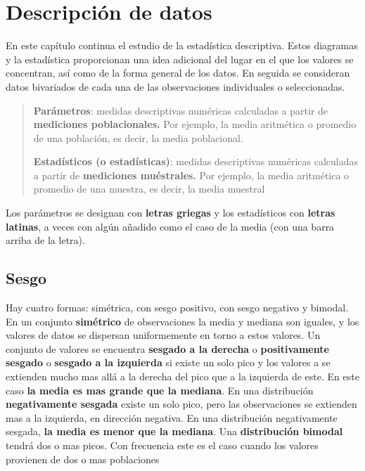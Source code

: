 \documentclass[]{article}
\begin{document}
\section{Descripción de datos}
En este capítulo continua el estudio de la estadística descriptiva. Estos diagramas y la estadística proporcionan una idea adicional del lugar en el que los valores se concentran, así como de la forma general de los datos. En seguida se consideran datos bivariados de cada una de las observaciones individuales o seleccionadas.
\begin{quote}
	\textbf{Parámetros}: medidas descriptivas numéricas calculadas a partir de \textbf{mediciones poblacionales.} Por ejemplo, la media aritmética o promedio de una población, es decir, la media poblacional.
	\item \textbf{Estadísticos (o estadísticas)}: medidas descriptivas numéricas calculadas a partir de \textbf{mediciones muéstrales.} Por ejemplo, la media aritmética o promedio de una muestra, es decir, la media muestral
\end{quote}
Los parámetros se designan con \textbf{letras griegas} y los estadísticos con \textbf{letras latinas}, a veces con algún añadido como el caso de la media (con una barra arriba de la letra).
\subsection{Sesgo}
Hay cuatro formas: simétrica, con sesgo positivo, con sesgo negativo y bimodal. En un conjunto \textbf{simétrico} de observaciones la media y mediana son iguales, y los valores de datos se dispersan uniformemente en torno a estos valores. Un conjunto de valores se encuentra \textbf{sesgado a la derecha} o \textbf{positivamente sesgado} o \textbf{sesgado a la izquierda} si existe un solo pico y los valores a se extienden mucho mas allá a la derecha del pico que a la izquierda de este. En este caso \textbf{la media es mas grande que la mediana}. En una distribución \textbf{negativamente sesgada} existe un solo pico, pero las observaciones se extienden mas a la izquierda, en dirección negativa. En una distribución negativamente sesgada, \textbf{la media es menor que la mediana}. Una \textbf{distribución bimodal} tendrá dos o mas picos. Con frecuencia este es el caso cuando los valores provienen de dos o mas poblaciones
\end{document}
